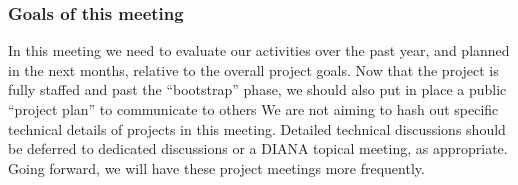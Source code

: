\begin{frame}
\frametitle{Goals of this meeting}

In this meeting we need to evaluate our activities over the past year, and planned in the next months, relative to the overall project goals.
\vskip 0.15in
Now that the project is fully staffed and past the ``bootstrap'' phase, we should also put in place a public ``project plan'' to communicate to others
\vskip 0.15in
We are not aiming to hash out specific technical details of projects in this meeting.
\vskip 0.15in
Detailed technical discussions should be deferred to dedicated discussions or a DIANA topical meeting, as appropriate.
\vskip 0.15in
Going forward, we will have these project meetings more frequently. 
\end{frame}


